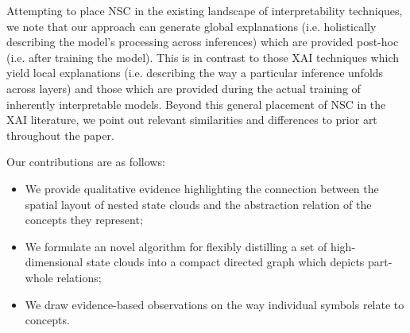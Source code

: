 Attempting to place NSC in the existing landscape of interpretability techniques, we note that our approach can generate global explanations (i.e. holistically describing the model's processing across inferences) which are provided post-hoc (i.e. after training the model). This is in contrast to those XAI techniques which yield local explanations (i.e. describing the way a particular inference unfolds across layers) and those which are provided during the actual training of inherently interpretable models. Beyond this general placement of NSC in the XAI literature, we point out relevant similarities and differences to prior art throughout the paper.

Our contributions are as follows:

\begin{itemize}
    \item We provide qualitative evidence highlighting the connection between the spatial layout of nested state clouds and the abstraction relation of the concepts they represent;
    \item We formulate an novel algorithm for flexibly distilling a set of high-dimensional state clouds into a compact directed graph which depicts part-whole relations;
    \item We draw evidence-based observations on the way individual symbols relate to concepts.
\end{itemize}